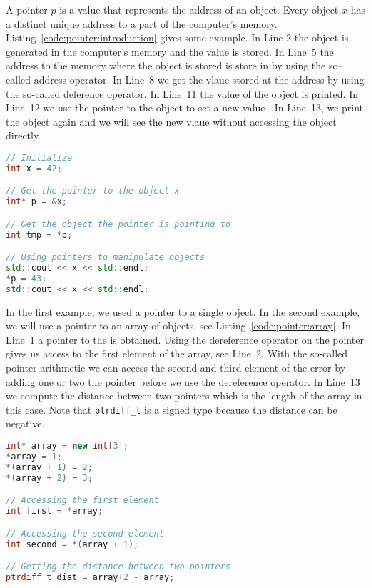 A pointer $p$ is a value that represents the address of an object. Every object $x$ has a distinct unique address to a part of the computer's memory. Listing~\ref{code:pointer:introduction} gives some example. In Line 2 the object  is generated in the computer's memory and the value  is stored. In Line~5 the address to the memory where the object  is stored is store in  by using the so--called \cpp{&} address operator. In Line~8 we get the vlaue  stored at the address  by using the so-called deference operator. In Line~11 the value  of the object  is printed. In Line~12 we use the pointer  to the object  to set a new value . In Line~13, we print the object  again and we will see the new vlaue  without accessing the object  directly.\\

\begin{lstlisting}[language=c++,caption={Introduction to pointers to objects.
\label{code:pointer:introduction}},float,floatplacement=tb]
// Initialize
int x = 42;

// Get the pointer to the object x
int* p = &x;

// Get the object the pointer is pointing to
int tmp = *p;

// Using pointers to manipulate objects
std::cout << x << std::endl;
*p = 43;
std::cout << x << std::endl;

\end{lstlisting}

In the first example, we used a pointer to a single object. In the second example, we will use a pointer to an array of objects, see Listing~\ref{code:pointer:array}. In Line~1 a pointer to the  is obtained. Using the dereference operator on the pointer gives us access to the first element of the array, see Line~2. With the so-called pointer arithmetic we can access the second and third element of the error by adding one or two the pointer before we use the dereference operator. In Line~13 we compute the distance between two pointers which is the length of the array in this case. Note that \lstinline|ptrdiff_t| is a signed type because the distance can be negative.\\


\begin{lstlisting}[language=c++,caption={Introduction to pointers to range of objects.
\label{code:pointer:array}},float,floatplacement=tb]
int* array = new int[3];
*array = 1;
*(array + 1) = 2;
*(array + 2) = 3;

// Accessing the first element
int first = *array;

// Accessing the second element
int second = *(array + 1);

// Getting the distance between two pointers
ptrdiff_t dist = array+2 - array;
\end{lstlisting}

